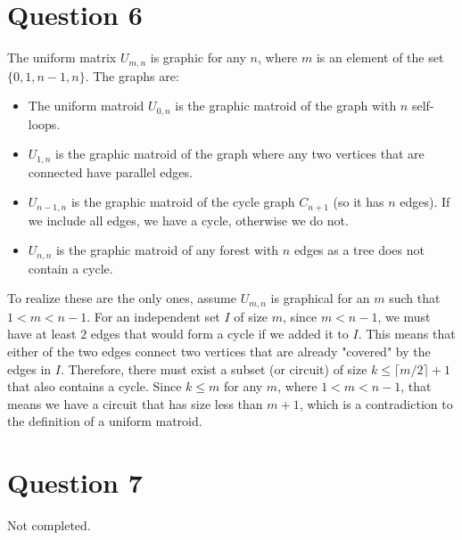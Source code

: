\documentclass[a4paper, fleqn]{article}
\begin{document}
\section*{Question 6}
The uniform matrix $U_{m,n}$ is graphic for any $n$, where $m$ is an element of the set $\{0,1,n-1, n\}$. The graphs are:
\begin{itemize}
  \item The uniform matroid $U_{0,n}$ is the graphic matroid of the graph with $n$ self-loops.
  \item $U_{1,n}$ is the graphic matroid of the graph where any two vertices that are connected have parallel edges.
  \item $U_{n-1, n}$ is the graphic matroid of the cycle graph $C_{n+1}$ (so it has $n$ edges). If we include all edges, we have a cycle, otherwise we do not.
  \item $U_{n,n}$ is the graphic matroid of any forest with $n$ edges as a tree does not contain a cycle.
\end{itemize}
To realize these are the only ones, assume $U_{m,n}$ is graphical for an $m$ such that $1<m<n-1$. For an independent set $I$ of size $m$, since $m<n-1$, we must have at least $2$ edges that would form a cycle if we added it to $I$. This means that either of the two edges connect two vertices that are already "covered" by the edges in $I$. Therefore, there must exist a subset (or circuit) of size $k\leq \lceil m/2\rceil +1$ that also contains a cycle. Since $k \leq m$ for any $m$, where $1<m<n-1$, that means we have a circuit that has size less than $m+1$, which is a contradiction to the definition of a uniform matroid.

\section*{Question 7}
Not completed.
\end{document}
